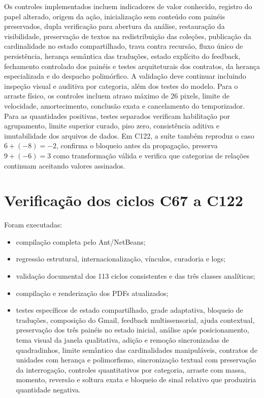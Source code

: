 \documentclass[12pt,a4paper]{article}
\begin{document}
Os controles implementados incluem indicadores de valor conhecido, registro do papel alterado, origem da ação, inicialização sem conteúdo com painéis preservados, dupla verificação para abertura da análise, restauração da visibilidade, preservação de textos na redistribuição das coleções, publicação da cardinalidade no estado compartilhado, trava contra recursão, fluxo único de persistência, herança semântica das traduções, estado explícito do feedback, fechamento controlado dos painéis e testes arquiteturais dos contratos, da herança especializada e do despacho polimórfico. A validação deve continuar incluindo inspeção visual e auditiva por categoria, além dos testes do modelo. Para o arraste físico, os controles incluem atraso máximo de 26 pixels, limite de velocidade, amortecimento, conclusão exata e cancelamento do temporizador. Para as quantidades positivas, testes separados verificam habilitação por agrupamento, limite superior curado, piso zero, consistência aditiva e imutabilidade dos arquivos de dados. Em C122, a suíte também reproduz o caso $6+(-8)=-2$, confirma o bloqueio antes da propagação, preserva $9+(-6)=3$ como transformação válida e verifica que categorias de relações continuam aceitando valores assinados.

\section{Verificação dos ciclos C67 a C122}

Foram executadas:
\begin{itemize}[noitemsep]
  \item compilação completa pelo Ant/NetBeans;
  \item regressão estrutural, internacionalização, vínculos, curadoria e logs;
  \item validação documental dos 113 ciclos consistentes e das três classes analíticas;
  \item compilação e renderização dos PDFs atualizados;
  \item testes específicos de estado compartilhado, grade adaptativa, bloqueio de traduções, composição do Gmail, feedback multissensorial, ajuda contextual, preservação dos três painéis no estado inicial, análise após posicionamento, tema visual da janela qualitativa, adição e remoção sincronizadas de quadradinhos, limite semântico das cardinalidades manipuláveis, contratos de unidades com herança e polimorfismo, sincronização textual com preservação da interrogação, controles quantitativos por categoria, arraste com massa, momento, reversão e soltura exata e bloqueio de sinal relativo que produziria quantidade negativa.
\end{itemize}
\end{document}
